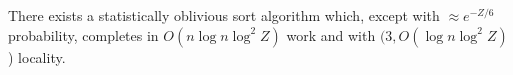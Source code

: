 \begin{corollary}
There exists a statistically oblivious sort algorithm which, except with $\approx e^{-Z/6}$ probability, completes in $O(n \log n \log^2 Z)$ work and with $(3, O(\log n \log^2 Z)$) locality.
\end{corollary}
%


